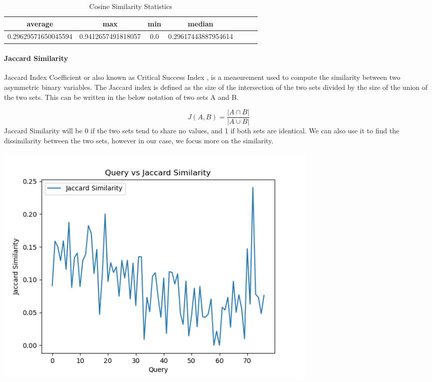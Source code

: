 \documentclass[50pt]{usiinfbachelorproject}
\begin{document}
  \begin{table}[H]
    \centering
    \begin{tabular}{|c|c|c|c|c|c|c|}
      \hline
      average & max & min & median \\
      \hline
      \hline
      0.29629571650045594 & 0.9412657491818057 & 0.0 & 0.29617443887954614 \\
      \hline
    \end{tabular}
    \caption{Cosine Similarity Statistics}
    \label{tab:cosine_similarity_statistics}
  \end{table}

\paragraph{Jaccard Similarity}
Jaccard Index Coefficient or also known as Critical Success Index \cite{niwattanakul2013using}, is a measurement used to compute the similarity between two asymmetric binary variables. The Jaccard index is defined as the size of the intersection of the two sets divided by the size of the union of the two sets. This can be written in the below notation of two sets A and B.

\begin{equation}
  J(A,B) = \frac{|A \cap B|}{|A \cup B|}
\end{equation}
Jaccard Similarity will be 0 if the two sets tend to share no values, and 1 if both sets are identical. We can also use it to find the dissimilarity between the two sets, however in our case, we focus more on the similarity.
\noindent
  \begin{minipage}{\linewidth}
  \centering
  \includegraphics[width=0.7\textwidth]{images/jaccard-similarity.png}
  \label{fig:jaccard-similarity}
  \end{minipage}
  \\
\end{document}
